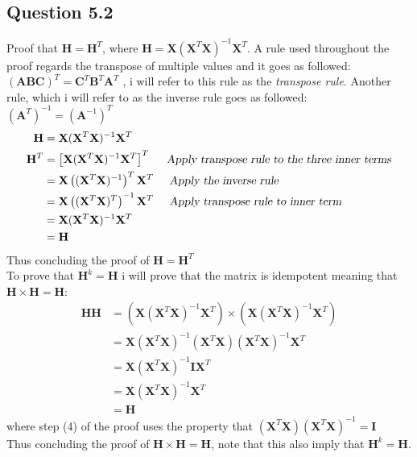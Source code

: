 \documentclass{article}
\begin{document}
\subsection{Question 5.2}
Proof that $\mathbf{H} = \mathbf{H}^T $, where $\mathbf{H} = \mathbf{X}(\mathbf{X}^T \mathbf{X})^{-1}\mathbf{X}^T$. A rule used throughout the proof regards the transpose of multiple values and it goes as followed: $ (\mathbf{A} \mathbf{B} \mathbf{C})^T = \mathbf{C}^T \mathbf{B} ^T \mathbf{A}^T  $ , i will refer to this rule as the \textit{transpose rule}. Another rule, which i will refer to as the inverse rule goes as followed: $ (\mathbf{A}^{T})^{-1} = (\mathbf{A}^{-1})^{T} $
\begin{align*}
\mathbf{H} &= \mathbf{X}(\mathbf{X}^T \mathbf{X})^{-1}\mathbf{X}^T \\
\mathbf{H}^T &= \left[\mathbf{X}(\mathbf{X}^T \mathbf{X})^{-1}\mathbf{X}^T \right]^T  \hspace{0.5cm} \textsl{Apply transpose rule to the three inner terms} \\
&= \mathbf{X} \left( (\mathbf{X}^T \mathbf{X})^{-1}\right)^T \mathbf{X}^T \hspace{0.5cm} \textsl{Apply the inverse rule}  \\
&= \mathbf{X} \left( (\mathbf{X}^T \mathbf{X})^{T}\right)^{-1} \mathbf{X}^T \hspace{0.5cm} \textsl{Apply transpose rule to inner term} \\
&= \mathbf{X}  (\mathbf{X}^T \mathbf{X})^{-1}\mathbf{X}^T \\
&= \mathbf{H}
\end{align*}
Thus concluding the proof of $\mathbf{H} = \mathbf{H}^T $
\\
To prove that $\mathbf{H}^k = \mathbf{H}$ i will prove that the matrix is idempotent meaning that $\mathbf{H} \times \mathbf{H} = \mathbf{H}$:
\begin{align}
\mathbf{H}\mathbf{H} &= (\mathbf{X}(\mathbf{X}^T \mathbf{X})^{-1}\mathbf{X}^T) \times (\mathbf{X}(\mathbf{X}^T \mathbf{X})^{-1}\mathbf{X}^T) \\
&= \mathbf{X}(\mathbf{X}^T\mathbf{X})^{-1} (\mathbf{X}^T\mathbf{X})(\mathbf{X}^T\mathbf{X})^{-1} \mathbf{X}^T\\
&= \mathbf{X}(\mathbf{X}^T\mathbf{X})^{-1}  \mathbf{I} \mathbf{X}^T \\
&= \mathbf{X}(\mathbf{X}^T\mathbf{X})^{-1}  \mathbf{X}^T \\
&= \mathbf{H}
\end{align}
where step (4) of the proof uses the property that 
$  (\mathbf{X}^T\mathbf{X})(\mathbf{X}^T\mathbf{X})^{-1} = \mathbf{I} $ \\
Thus concluding the proof of $\mathbf{H} \times \mathbf{H} = \mathbf{H}$, note that this also imply that $\mathbf{H}^k = \mathbf{H}$.
\end{document}
